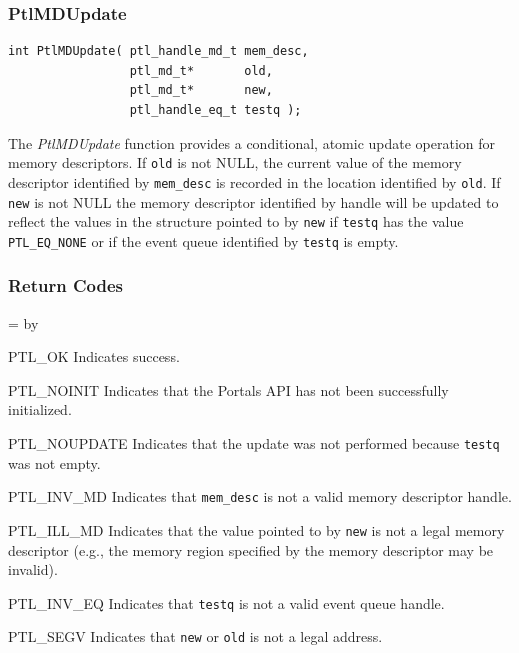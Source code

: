 \documentclass{sand-report}
\newcommand{\retlabel}[1]{\mbox{\texttt{#1}}\hfil}
\newenvironment{returns}%
  {\begin{list}{}%
      {\renewcommand{\makelabel}{\retlabel}%
        \topsep=0.0pt%
        \labelwidth=1.25in%
        \leftmargin=\labelwidth%
        \advance \leftmargin by \labelsep%
        \setlength{\itemsep}{.5\smallskipamount}%
        \setlength{\parsep}{0pt}}%
      }%
  {\end{list}}
\begin{document}
\subsubsection{PtlMDUpdate}\label{sec:mdupdate}
\begin{verbatim}
int PtlMDUpdate( ptl_handle_md_t mem_desc,
                 ptl_md_t*       old,
                 ptl_md_t*       new,
                 ptl_handle_eq_t testq );
\end{verbatim}

\noindent
The \emph{PtlMDUpdate} function provides a conditional, atomic update
operation for memory descriptors.  If \texttt{old} is not NULL, the
current value of the memory descriptor identified by \texttt{mem_desc}
is recorded in the location identified by \texttt{old}.  If
\texttt{new} is not NULL the memory descriptor identified by handle
will be updated to reflect the values in the structure pointed to by
\texttt{new} if \texttt{testq} has the value \texttt{PTL_EQ_NONE} or
if the event queue identified by \texttt{testq} is empty.

\subsubsection*{Return Codes}
\begin{returns}
\item[PTL_OK] Indicates success.
\item[PTL_NOINIT] Indicates that the Portals API has not been
  successfully initialized.
\item[PTL_NOUPDATE] Indicates that the update was not performed
  because \texttt{testq} was not empty.
\item[PTL_INV_MD] Indicates that \texttt{mem_desc} is not a valid
  memory descriptor handle.
\item[PTL_ILL_MD] Indicates that the value pointed to by \texttt{new}
  is not a legal memory descriptor (e.g., the memory region specified
  by the memory descriptor may be invalid).
\item[PTL_INV_EQ] Indicates that \texttt{testq} is not a valid event
  queue handle.
\item[PTL_SEGV] Indicates that \texttt{new} or \texttt{old} is not a
  legal address.
\end{returns}
\end{document}
